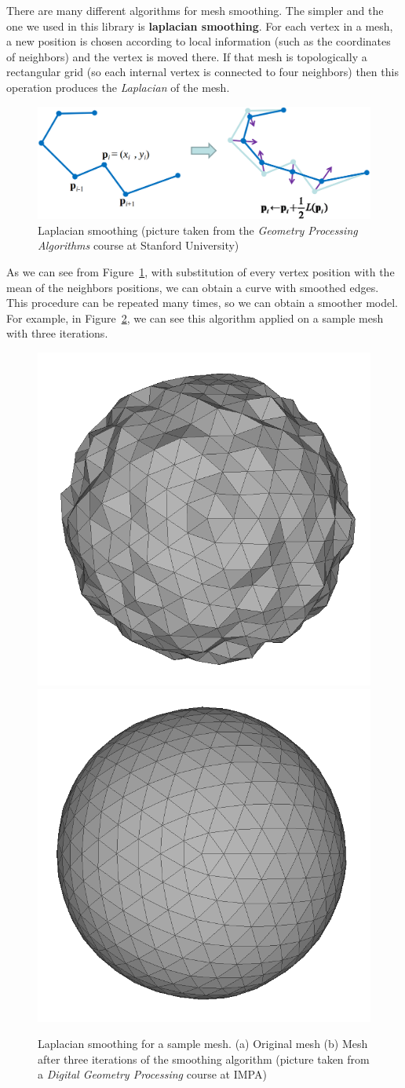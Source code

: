 \documentclass[11pt,oneside]{article}	%
\begin{document}
There are many different algorithms for mesh smoothing. The simpler and the one we used in this library is \textbf{laplacian smoothing}. For each vertex in a mesh, a new position is chosen according to local information (such as the coordinates of neighbors) and the vertex is moved there. If that mesh is topologically a rectangular grid (so each internal vertex is connected to four neighbors) then this operation produces the \textit{Laplacian} of the mesh.

\begin{figure}[htb] %
   \centering
   \includegraphics[width=0.60\linewidth]{images/LaplacianSmoothing.png}
   \caption{Laplacian smoothing (picture taken from the \textit{Geometry Processing Algorithms} course at Stanford University)}
   \label{fig:laplacianSmoothing}
\end{figure}

As we can see from Figure~\ref{fig:laplacianSmoothing}, with substitution of every vertex position with the mean of the neighbors positions, we can obtain a curve with smoothed edges. This procedure can be repeated many times, so we can obtain a smoother model. For example, in Figure~\ref{fig:smoothingExample}, we can see this algorithm applied on a sample mesh with three iterations.

\begin{figure}[htb] %
   \centering
   \includegraphics[width=0.30\linewidth]{images/SmoothingExample0.png}
   \includegraphics[width=0.30\linewidth]{images/SmoothingExample1.png}
   \caption{Laplacian smoothing for a sample mesh. (a) Original mesh (b) Mesh after three iterations of the smoothing algorithm (picture taken from a \textit{Digital Geometry Processing} course at IMPA)}
   \label{fig:smoothingExample}
\end{figure}
\end{document}

